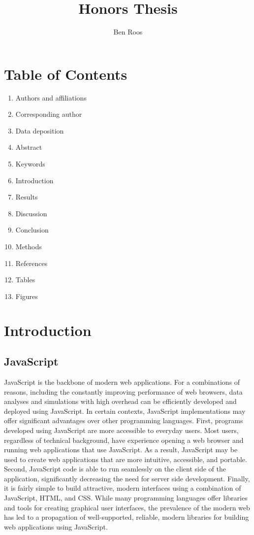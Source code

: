 \documentclass[12pt]{article}
\begin{document}
\begin{spacing}{.4}
\setlength{\droptitle}{-7em}
\title{Honors Thesis}
\author{Ben Roos}
\maketitle
\newpage
\end{spacing}

\begin{spacing}{1.5}

\section*{Table of Contents}
\begin{enumerate}
\item Authors and affiliations
\item Corresponding author
\item Data deposition
\item Abstract
\item Keywords
\item Introduction
\item Results
\item Discussion
\item Conclusion
\item Methods
\item References
\item Tables
\item Figures

\end{enumerate}
\newpage

\section{Introduction}
\subsection{JavaScript}
JavaScript is the backbone of modern web applications. For a combinations of reasons, including the constantly improving performance of web browsers, data analyses and simulations with high overhead can be efficiently developed and deployed using JavaScript. In certain contexts, JavaScript implementations may offer significant advantages over other programming languages. First, programs developed using JavaScript are more accessible to everyday users. Most users, regardless of technical background, have experience opening a web browser and running web applications that use JavaScript. As a result, JavaScript may be used to create web applications that are more intuitive, accessible, and portable. Second, JavaScript code is able to run seamlessly on the client side of the application, significantly decreasing the need for server side development. Finally, it is fairly simple to build attractive, modern interfaces using a combination of JavaScript, HTML, and CSS. While many programming languages offer libraries and tools for creating graphical user interfaces, the prevalence of the modern web has led to a propagation of well-supported, reliable, modern libraries for building web applications using JavaScript.

\end{spacing}
\end{document}
